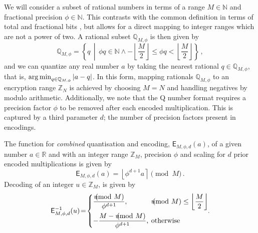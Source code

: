 \documentclass[10pt,letterpaper,oneside,twocolumn,journal]{IEEEtran}
\theoremstyle{definition}
\theoremstyle{definition}
\theoremstyle{remark}
\begin{document}
We will consider a subset of rational numbers in terms of a range $M \in \mathbb{N}$ and fractional precision $\phi \in \mathbb{N}$. This contrasts with the common definition in terms of total and fractional bits \cite{oberstarFixedPointRepresentationFractional2007,schulzedarupEncryptedCooperativeControl2019,farokhiSecurePrivateControl2017}, but allows for a direct mapping to integer ranges which are not a power of two. A rational subset $\mathbb{Q}_{M,\phi}$ is then given by
\begin{equation}
    \mathbb{Q}_{M,\phi} = \left\{q \,\middle|\, \phi q \in \mathbb{N} \wedge -\left\lfloor\frac{M}{2}\right\rfloor \leq \phi q < \left\lfloor\frac{M}{2}\right\rfloor \right\}\,,
\end{equation}
and we can quantize any real number $a$ by taking the nearest rational $q \in \mathbb{Q}_{M,\phi}$, that is, $\operatorname*{arg\,min}_{q\in\mathbb{Q}_{M,\phi}} |a-q|$. In this form, mapping rationals $\mathbb{Q}_{M,\phi}$ to an encryption range $\mathbb{Z}_N$ is achieved by choosing $M=N$ and handling negatives by modulo arithmetic. Additionally, we note that the Q number format requires a precision factor $\phi$ to be removed after each encoded multiplication. This is captured by a third parameter $d$; the number of precision factors present in encodings.

The function for \textit{combined} quantisation and encoding, $\mathsf{E}_{M,\phi,d}(a)$, of a given number $a \in \mathbb{R}$ and with an integer range $\mathbb{Z}_M$, precision $\phi$ and scaling for $d$ prior encoded multiplications is given by
\begin{equation}
    \mathsf{E}_{M,\phi,d}(a) = \left\lfloor \phi^{d+1} a \right\rceil \pmod{M}\,. \label{eqn:encode}
\end{equation}
Decoding of an integer $u \in \mathbb{Z}_M$, is given by
\begin{equation}
    \mathsf{E}^{-1}_{M,\phi,d}(u) \!=\! 
    \begin{dcases}
        \frac{u\hspace{-8pt}\pmod{M}}{\phi^{d+1}}, &\hspace{-6pt}u\hspace{-8pt}\pmod{M} \leq \left\lfloor\frac{M}{2}\right\rfloor \\
        -\frac{M - u\hspace{-8pt}\pmod{M}}{\phi^{d+1}}, &\hspace{-6pt}\text{otherwise} \\
    \end{dcases}\!\!.\label{eqn:decode}
\end{equation}
\end{document}
